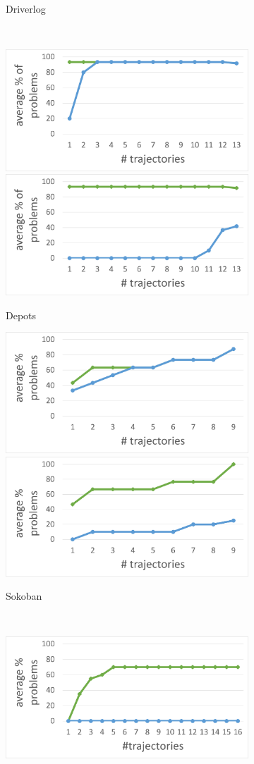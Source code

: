 \documentclass[letterpaper]{article} %
\theoremstyle{definition}
\theoremstyle{remark}
\begin{document}
\begin{figure}[htbp]
\begin{subfigure}[b]{\columnwidth}
    \caption{Driverlog}
    \label{fig:driverlog-results}
  \end{subfigure}\\
  \begin{subfigure}[b]{\columnwidth}
    \centering
    \includegraphics[width=0.48\columnwidth]{figures/depot_easy_learning.png}
    \includegraphics[width=0.48\columnwidth]{figures/depot_hard_learning.png}
    \caption{Depots}
    \label{fig:depots-results}
  \end{subfigure}
  \begin{subfigure}[b]{\columnwidth}
    \centering
    \includegraphics[width=0.48\columnwidth]{figures/sok_easy_learning.png}
    \includegraphics[width=0.48\columnwidth]{figures/sok_hard_learning.png}
    \caption{Sokoban}
    \label{fig:sokoban-results}
  \end{subfigure}\\
  \begin{subfigure}[b]{\columnwidth}
    \centering
    \includegraphics[width=0.48\columnwidth]{figures/rover_easy_learning.png}

\end{subfigure}
\end{figure}
\end{document}
